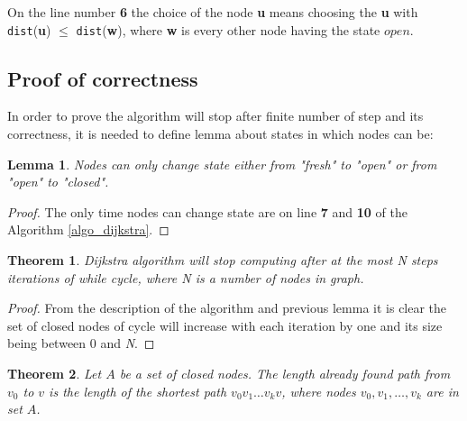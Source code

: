 \documentclass[thesis=M,english]{FITthesis}[2012/10/20]
\newtheorem{theorem}{Theorem}
\newtheorem{lemma}{Lemma}
\begin{document}
On the line number \textbf{6} the choice of the node \textbf{u} means choosing the \textbf{u} with \texttt{dist}(\textbf{u}) $ \leq $ \texttt{dist}(\textbf{w}), where \textbf{w} is every other node having the state $open$.

\subsection{Proof of correctness}

In order to prove the algorithm will stop after finite number of step and its correctness, it is needed to define lemma about states in which nodes can be:

\begin{lemma}
Nodes can only change state either from "\textit{fresh}" to "\textit{open}" or from "\textit{open}" to "\textit{closed}".
\end{lemma}

\begin{proof}
The only time nodes can change state are on line \textbf{7} and \textbf{10} of the Algorithm \ref{algo_dijkstra}.
\end{proof}

\begin{theorem}
\label{theorem2}
Dijkstra algorithm will stop computing after at the most \textit{N} steps iterations of while cycle, where N is a number of nodes in graph. 
\end{theorem}

\begin{proof}
From the description of the algorithm and previous lemma it is clear the set of closed nodes of cycle will increase with each iteration by one and its size being between 0 and \textit{N}.
\end{proof}

\begin{theorem}
Let $A$ be a set of closed nodes. The length already found path from $v_0$ to $v$ is the length of the shortest path $v_0 v_1 \dots v_k v$, where nodes $v_0, v_1, \dots , v_k$ are in set $A$.
\end{theorem}
\end{document}
